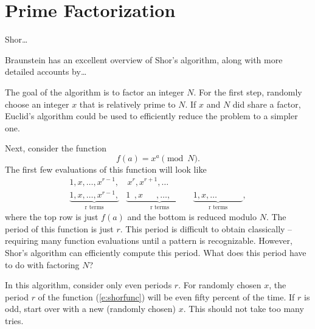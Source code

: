 \section{Prime Factorization}

Shor\dots

Braunstein\cite{Braunstein:96} has an excellent overview of Shor's algorithm,
along with more detailed accounts by\dots

The goal of the algorithm is to factor an integer $N$.
For the first step, randomly choose an integer $x$ that
is relatively prime to $N$.  If $x$ and $N$ did share a 
factor, Euclid's algorithm could be used to efficiently 
reduce the problem to a simpler one.

Next, consider the function
\begin{equation}
f(a) = x^a\pmod{N}.
\label{e:shorfunc}
\end{equation}
The first few evaluations of this function will look like
\begin{equation}
\begin{split}
1,x,\ldots,x^{r-1},             &\,x^r,x^{r+1},\ldots\\
\underbrace{1,x,\ldots,x^{r-1},}_{\text{r terms}}
&\underbrace{1^{\phantom{x}},x^{\phantom{r-1}},\ldots,\phantom{x^{r-1},}}_{\text{r terms}}
\underbrace{ 1,x,\ldots\phantom{,x^{r-1},}}_{\text{r terms}},
\end{split}
\end{equation}
where the top row is just $f(a)$ and the bottom is reduced modulo $N$.
The period of this function is just $r$.  This period is difficult to
obtain classically -- requiring many function evaluations until a pattern
is recognizable.  However, Shor's algorithm can efficiently compute this
period.  What does this period have to do with factoring $N$?

In this algorithm, consider only even periods $r$.
For randomly chosen $x$, the period $r$ of the function (\ref{e:shorfunc})
will be even fifty percent of the time.  If $r$ is odd, start over with
a new (randomly chosen) $x$.  This should not take too many 
tries\cite{Shor:94,Ekert/Jozsa:96}.


